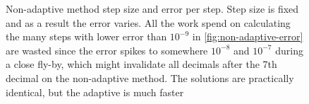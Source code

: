 \begin{figure}
{        \label{fig:non-adaptive-error}
        }
        \caption{Non-adaptive method step size and error per step. Step size is fixed and as a result the error varies. All the work spend on calculating the many steps with lower error than $10^{-9}$ in \ref{fig:non-adaptive-error} are wasted since the error spikes to somewhere $10^{-8}$ and $10^{-7}$ during a close fly-by, which might invalidate all decimals after the 7th decimal on the non-adaptive method. The solutions are practically identical, but the adaptive is much faster}
        \label{fig:non-adaptive-step_error}
\end{figure}


\begin{figure}
    \centering
\end{figure}

